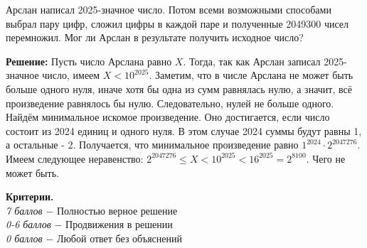  Арслан написал 2025-значное число. Потом всеми возможными способами выбрал пару цифр, сложил цифры в каждой паре и полученные 2049300 чисел перемножил. Мог ли Арслан в результате получить исходное число? 

\textbf{Решение:} Пусть число Арслана равно $X$. Тогда, так как Арслан записал 2025-значное число, имеем $X<10^{2025}$. Заметим, что в числе Арслана не может быть больше одного нуля, иначе хотя бы одна из сумм равнялась нулю, а значит, всё произведение равнялось бы нулю. Следовательно, нулей не больше одного. Найдём минимальное искомое произведение. Оно достигается, если число состоит из 2024 единиц и одного нуля. В этом случае 2024 суммы будут равны 1, а остальные - 2. Получается, что минимальное произведение равно $1^{2024}\cdot 2^{2047276}$. Имеем следующее неравенство: $2^{2047276}\leq X<10^{2025}<16^{2025}=2^{8100}$. Чего не может быть.

\textbf{Критерии.} \\
\textit{7 баллов} $-$ Полностью верное решение\\
\textit{0-6 баллов} $-$ Продвижения в решении\\
\textit{0 баллов} $-$ Любой ответ без объяснений\\
